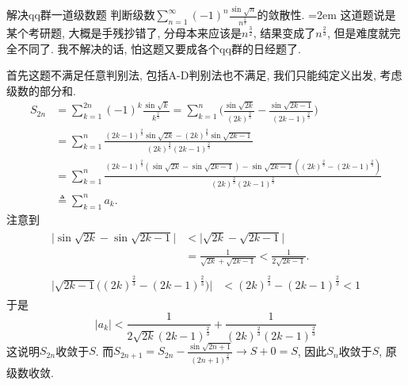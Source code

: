 \documentclass[UTF8,no-math,12pt,openany,table,dvipsnames,svgnames]{book}
\begin{document}
\newpage
\begin{MYBOX}[colbacktitle=blue]{解决qq群一道级数题}
  判断级数$\sum_{n=1}^\infty(-1)^n\frac{\sin\sqrt n}{n^{\frac23}}$的敛散性.
  \tcblower \parindent=2em
  这道题说是某个考研题, 大概是手残抄错了, 分母本来应该是$n^{\frac32}$, 结果变成了$n^{\frac23}$, 但是难度就完全不同了. 我不解决的话, 怕这题又要成各个qq群的日经题了.

  首先这题不满足任意判别法, 包括A-D判别法也不满足, 我们只能纯定义出发, 考虑级数的部分和.
  \begin{align*}
    S_{2n} & = \sum_{k=1}^{2n}(-1)^k\frac{\sin\sqrt k}{k^{\frac23}}
             = \sum_{k=1}^n\bigg( \frac{\sin\sqrt{2k}}{(2k)^{\frac23}}
             - \frac{\sin\sqrt{2k-1}}{(2k-1)^{\frac23}}
             \bigg)  \\
           & = \sum_{k=1}^n{\frac{\left( 2k-1 \right) ^{\frac{2}{3}}\sin \sqrt{2k}-\left( 2k \right) ^{\frac{2}{3}}\sin \sqrt{2k-1}}{\left( 2k \right) ^{\frac{2}{3}}\left( 2k-1 \right) ^{\frac{2}{3}}}}\\
           & = \sum_{k=1}^n{\frac{\left( 2k-1 \right) ^{\frac{2}{3}}\left( \sin \sqrt{2k}-\sin \sqrt{2k-1} \right) -\sin \sqrt{2k-1}\left( \left( 2k \right) ^{\frac{2}{3}}-\left( 2k-1 \right) ^{\frac{2}{3}} \right)}{\left( 2k \right) ^{\frac{2}{3}}\left( 2k-1 \right) ^{\frac{2}{3}}}}\\
           & \triangleq \sum_{k=1}^na_k.
  \end{align*}
注意到
\begin{gather*}
  \begin{aligned}
    \big| \sin\sqrt{2k}-\sin\sqrt{2k-1} \big|
    & < \big| \sqrt{2k}-\sqrt{2k-1} \big|\\
    & = \frac1{\sqrt{2k}+\sqrt{2k-1}} < \frac1{2\sqrt{2k-1}}.
  \end{aligned}\\
  \begin{aligned}
    \Big| \sqrt{2k-1}\Big( (2k)^{\frac23}-(2k-1)^{\frac23} \Big) \Big| & < (2k)^{\frac23}-(2k-1)^{\frac23} < 1
  \end{aligned}
\end{gather*}
于是
\[
\left| a_k \right|<\frac{1}{2\sqrt{2k}\left( 2k-1 \right) ^{\frac{2}{3}}}+\frac{1}{\left( 2k \right) ^{\frac{2}{3}}\left( 2k-1 \right) ^{\frac{2}{3}}}
\]
这说明$S_{2n}$收敛于$S$. 而$S_{2n+1}=S_{2n}-\frac{\sin\sqrt{2n+1}}{(2n+1)^{\frac23}}\to S+0=S$, 因此$S_n$收敛于$S$, 原级数收敛.
\end{MYBOX}
\end{document}
